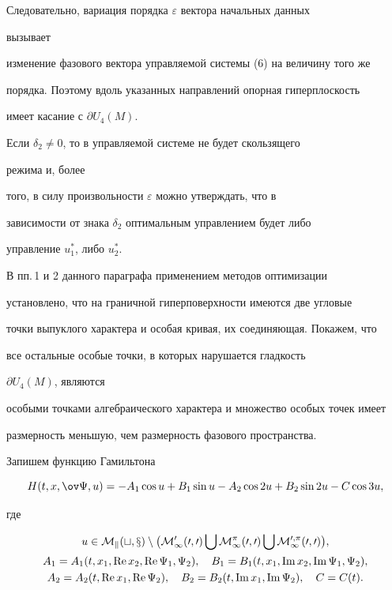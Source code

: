 Следовательно, вариация порядка $\varepsilon$ вектора начальных данных


вызывает


изменение фазового вектора управляемой системы (6) на величину того же


порядка. Поэтому вдоль указанных направлений опорная гиперплоскость


имеет касание с $\partial U_4(M)$.





Если $\delta_2\ne 0$, то в управляемой системе не будет скользящего


режима и, более


того, в силу произвольности $\varepsilon$ можно утверждать, что в


зависимости от знака $\delta_2$ оптимальным управлением будет либо


управление $u^*_1$, либо $u^*_2$.


\medskip





В пп.\,1 и 2 данного параграфа применением методов оптимизации


установлено, что на граничной гиперповерхности имеются две угловые


точки выпуклого характера и особая кривая, их соединяющая. Покажем, что


все остальные особые точки, в которых нарушается гладкость


$\partial U_4(M)$, являются


особыми точками алгебраического характера и множество особых точек имеет


размерность меньшую, чем размерность фазового пространства.





Запишем функцию Гамильтона


$$


H(t,x,\ov\Psi,u)=-A_1\cos u+B_1\sin u-A_2\cos 2u+


B_2\sin 2u-C\cos 3u,


$$


где


\begin{gather*}


u\in\cal M_k(t,x)\setminus\bigl(\cal M^0_1(0,0)\bigcup\cal M^\pi_1(0,0)


\bigcup\cal M^{0,\pi}_1(0,0)\bigr), \\


A_1=A_1(t,x_1,\re x_2,\re\Psi_1,\Psi_2),\quad


B_1=B_1(t,x_1,\im x_2,\im\Psi_1,\Psi_2), \\


A_2=A_2(t,\re x_1,\re\Psi_2),\quad


B_2=B_2(t,\im x_1,\im\Psi_2),\quad C=C(t).


\end{gather*}


